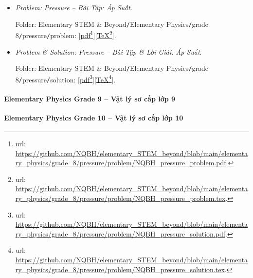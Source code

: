 \documentclass[12pt]{article}
\begin{document}
\begin{itemize}
	\item {\it Problem: Pressure -- Bài Tập: Áp Suất}.
	
	Folder: {\sf Elementary STEM \& Beyond{\tt/}Elementary Physics{\tt/}grade 8{\tt/}pressure{\tt/}problem}: [\href{https://github.com/NQBH/elementary_STEM_beyond/blob/main/elementary_physics/grade_8/pressure/problem/NQBH_pressure_problem.pdf}{pdf}\footnote{{\sc url}: \url{https://github.com/NQBH/elementary_STEM_beyond/blob/main/elementary_physics/grade_8/pressure/problem/NQBH_pressure_problem.pdf}.}][\href{https://github.com/NQBH/elementary_STEM_beyond/blob/main/elementary_physics/grade_8/pressure/problem/NQBH_pressure_problem.tex}{\TeX}\footnote{{\sc url}: \url{https://github.com/NQBH/elementary_STEM_beyond/blob/main/elementary_physics/grade_8/pressure/problem/NQBH_pressure_problem.tex}.}].
	\item {\it Problem \& Solution: Pressure -- Bài Tập \& Lời Giải: Áp Suất}.
	
	Folder: {\sf Elementary STEM \& Beyond{\tt/}Elementary Physics{\tt/}grade 8{\tt/}pressure{\tt/}solution}: [\href{https://github.com/NQBH/elementary_STEM_beyond/blob/main/elementary_physics/grade_8/pressure/problem/NQBH_pressure_solution.pdf}{pdf}\footnote{{\sc url}: \url{https://github.com/NQBH/elementary_STEM_beyond/blob/main/elementary_physics/grade_8/pressure/problem/NQBH_pressure_solution.pdf}.}][\href{https://github.com/NQBH/elementary_STEM_beyond/blob/main/elementary_physics/grade_8/pressure/problem/NQBH_pressure_solution.tex}{\TeX}\footnote{{\sc url}: \url{https://github.com/NQBH/elementary_STEM_beyond/blob/main/elementary_physics/grade_8/pressure/problem/NQBH_pressure_solution.tex}.}].
\end{itemize}

\paragraph{Elementary Physics Grade 9 -- Vật lý sơ cấp lớp 9}

\paragraph{Elementary Physics Grade 10 -- Vật lý sơ cấp lớp 10}
\end{document}
